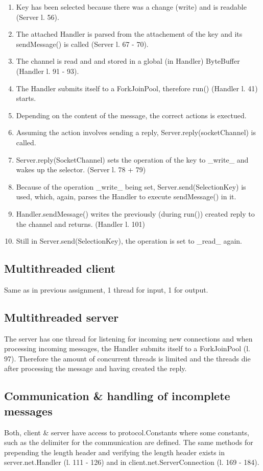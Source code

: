 \documentclass[a4paper]{scrartcl}
\begin{document}
\begin{enumerate}
    \item Key has been selected because there was a change (write) and is readable (Server l. 56).
    \item The attached Handler is parsed from the attachement of the key and its sendMessage() is called (Server l. 67 - 70).
    \item The channel is read and and stored in a global (in Handler) ByteBuffer (Handler l. 91 - 93).
    \item The Handler submits itself to a ForkJoinPool, therefore run() (Handler l. 41) starts.
    \item Depending on the content of the message, the correct actions is exectued.
    \item Assuming the action involves sending a reply, Server.reply(socketChannel) is called.
    \item Server.reply(SocketChannel) sets the operation of the key to _write_ and wakes up the selector. (Server l. 78 + 79)
    \item Because of the operation _write_ being set, Server.send(SelectionKey) is used, which, again, parses the Handler to execute sendMessage() in it.
    \item Handler.sendMessage() writes the previously (during run()) created reply to the channel and returns. (Handler l. 101)
    \item Still in Server.send(SelectionKey), the operation is set to _read_ again.
\end{enumerate}


\subsection{Multithreaded client}
Same as in previous assignment, 1 thread for input, 1 for output.


\subsection{Multithreaded server}
The server has one thread for listening for incoming new connections and when processing incoming messages, the Handler submits itself to a ForkJoinPool (l. 97).
Therefore the amount of concurrent threads is limited and the threads die after processing the message and having created the reply.


\subsection{Communication \& handling of incomplete messages}
Both, client \& server have access to protocol.Constants where some constants, such as the delimiter for the communication are defined.
The same methods for prepending the length header and verifying the length header exists in server.net.Handler (l. 111 - 126) and in client.net.ServerConnection (l. 169 - 184).
\end{document}
